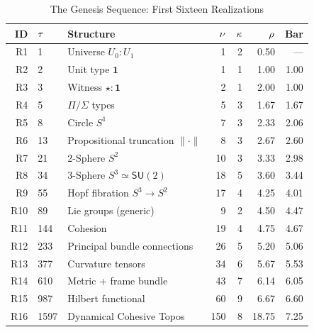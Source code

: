 \documentclass[11pt]{article}
\theoremstyle{definition}
\theoremstyle{remark}
\begin{document}
\begin{table}[htbp]
\centering
\caption{The Genesis Sequence: First Sixteen Realizations}
\label{tab:genesis-sequence}
\small
\begin{tabular}{@{}rllrrrr@{}}
\toprule
\textbf{ID} & $\boldmath{\tau}$ & \textbf{Structure} & $\boldmath{\nu}$ & $\boldmath{\kappa}$ & $\boldmath{\rho}$ & \textbf{Bar} \\
\midrule
R1  & 1    & Universe $U_0 : U_1$                & 1   & 2 & 0.50 & ---  \\
R2  & 2    & Unit type $\mathbf{1}$              & 1   & 1 & 1.00 & 1.00 \\
R3  & 3    & Witness $\star : \mathbf{1}$        & 2   & 1 & 2.00 & 1.00 \\
R4  & 5    & $\Pi/\Sigma$ types                   & 5   & 3 & 1.67 & 1.67 \\
R5  & 8    & Circle $S^1$                         & 7   & 3 & 2.33 & 2.06 \\
R6  & 13   & Propositional truncation $\|\cdot\|$ & 8   & 3 & 2.67 & 2.60 \\
R7  & 21   & 2-Sphere $S^2$                       & 10  & 3 & 3.33 & 2.98 \\
R8  & 34   & 3-Sphere $S^3 \simeq \mathsf{SU}(2)$ & 18  & 5 & 3.60 & 3.44 \\
R9  & 55   & Hopf fibration $S^3 \to S^2$        & 17  & 4 & 4.25 & 4.01 \\
R10 & 89   & Lie groups (generic)                 & 9   & 2 & 4.50 & 4.47 \\
R11 & 144  & Cohesion                             & 19  & 4 & 4.75 & 4.67 \\
R12 & 233  & Principal bundle connections         & 26  & 5 & 5.20 & 5.06 \\
R13 & 377  & Curvature tensors                    & 34  & 6 & 5.67 & 5.53 \\
R14 & 610  & Metric + frame bundle                & 43  & 7 & 6.14 & 6.05 \\
R15 & 987  & Hilbert functional                   & 60  & 9 & 6.67 & 6.60 \\
R16 & 1597 & Dynamical Cohesive Topos             & 150 & 8 & 18.75 & 7.25 \\
\bottomrule
\end{tabular}
\end{table}
\end{document}
